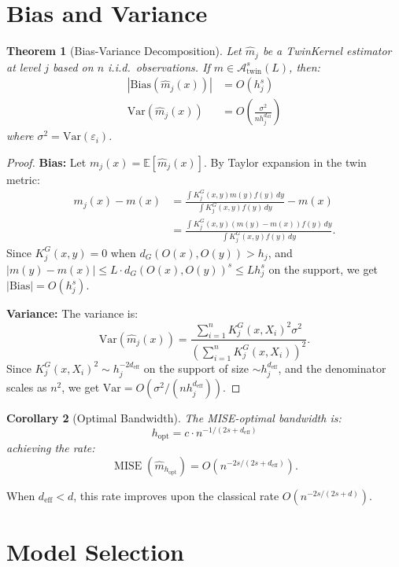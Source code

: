\documentclass[11pt,twoside,openright]{book}
\theoremstyle{plain}
\newtheorem{theorem}{Theorem}[chapter]
\newtheorem{corollary}[theorem]{Corollary}
\theoremstyle{definition}
\theoremstyle{remark}
\newcommand{\calA}{\mathcal{A}}
\newcommand{\E}{\mathbb{E}}
\newcommand{\var}{\mathrm{Var}}
\newcommand{\deff}{d_{\mathrm{eff}}}
\DeclareMathOperator{\MISE}{MISE}
\begin{document}
\section{Bias and Variance}

\begin{theorem}[Bias-Variance Decomposition]
\label{thm:bias-variance}
Let $\hat{m}_j$ be a TwinKernel estimator at level $j$ based on $n$ i.i.d.\ observations. If $m \in \calA_{\text{twin}}^s(L)$, then:
\begin{align}
|\text{Bias}(\hat{m}_j(x))| &= O(h_j^s) \label{eq:bias}\\
\var(\hat{m}_j(x)) &= O\left(\frac{\sigma^2}{n h_j^{\deff}}\right) \label{eq:variance}
\end{align}
where $\sigma^2 = \var(\varepsilon_i)$.
\end{theorem}

\begin{proof}
\textbf{Bias:} Let $m_j(x) = \E[\hat{m}_j(x)]$. By Taylor expansion in the twin metric:
\begin{align}
m_j(x) - m(x) &= \frac{\int K_j^G(x, y) m(y) f(y) \, dy}{\int K_j^G(x, y) f(y) \, dy} - m(x) \\
&= \frac{\int K_j^G(x, y) (m(y) - m(x)) f(y) \, dy}{\int K_j^G(x, y) f(y) \, dy}.
\end{align}
Since $K_j^G(x, y) = 0$ when $d_G(O(x), O(y)) > h_j$, and $|m(y) - m(x)| \leq L \cdot d_G(O(x), O(y))^s \leq L h_j^s$ on the support, we get $|\text{Bias}| = O(h_j^s)$.

\textbf{Variance:} The variance is:
\[
\var(\hat{m}_j(x)) = \frac{\sum_{i=1}^n K_j^G(x, X_i)^2 \sigma^2}{(\sum_{i=1}^n K_j^G(x, X_i))^2}.
\]
Since $K_j^G(x, X_i)^2 \sim h_j^{-2\deff}$ on the support of size $\sim h_j^{\deff}$, and the denominator scales as $n^2$, we get $\var = O(\sigma^2 / (n h_j^{\deff}))$.
\end{proof}

\begin{corollary}[Optimal Bandwidth]
The MISE-optimal bandwidth is:
\[
h_{\text{opt}} = c \cdot n^{-1/(2s + \deff)}
\]
achieving the rate:
\[
\MISE(\hat{m}_{h_{\text{opt}}}) = O(n^{-2s/(2s + \deff)}).
\]
\end{corollary}

When $\deff < d$, this rate improves upon the classical rate $O(n^{-2s/(2s+d)})$.

\section{Model Selection}
\end{document}
